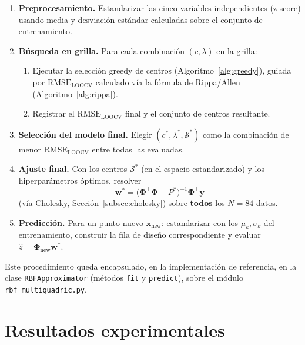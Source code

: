 \documentclass[11pt,a4paper]{article}
\newcommand{\Phimat}{\boldsymbol{\Phi}}
\newcommand{\wvec}{\mathbf{w}}
\newcommand{\yvec}{\mathbf{y}}
\begin{document}
\begin{enumerate}
    \item \textbf{Preprocesamiento.} Estandarizar las cinco variables
    independientes (z-score) usando media y desviaci\'on est\'andar
    calculadas sobre el conjunto de entrenamiento.

    \item \textbf{B\'usqueda en grilla.} Para cada combinaci\'on
    $(c,\lambda)$ en la grilla:
    \begin{enumerate}
        \item Ejecutar la selecci\'on greedy de centros
        (Algoritmo~\ref{alg:greedy}), guiada por $\text{RMSE}_{\text{LOOCV}}$
        calculado v\'ia la f\'ormula de Rippa/Allen (Algoritmo~\ref{alg:rippa}).
        \item Registrar el $\text{RMSE}_{\text{LOOCV}}$ final y el conjunto de
        centros resultante.
    \end{enumerate}

    \item \textbf{Selecci\'on del modelo final.} Elegir $(c^\ast,\lambda^\ast,
    \mathcal S^\ast)$ como la combinaci\'on de menor $\text{RMSE}_{\text{LOOCV}}$
    entre todas las evaluadas.

    \item \textbf{Ajuste final.} Con los centros $\mathcal S^\ast$ (en el
    espacio estandarizado) y los hiperpar\'ametros \'optimos, resolver
    \[
    \wvec^\ast = \big(\Phimat^{\!\top}\Phimat + P^\ast\big)^{-1}
    \Phimat^{\!\top}\yvec
    \]
    (v\'ia Cholesky, Secci\'on~\ref{subsec:cholesky}) sobre \textbf{todos} los
    $N=84$ datos.

    \item \textbf{Predicci\'on.} Para un punto nuevo $\mathbf x_{\text{new}}$:
    estandarizar con los $\mu_k,\sigma_k$ del entrenamiento, construir la fila
    de dise\~no correspondiente y evaluar $\hat z = \Phimat_{\text{new}}
    \wvec^\ast$.
\end{enumerate}

Este procedimiento queda encapsulado, en la implementaci\'on de referencia, en
la clase \texttt{RBFApproximator} (m\'etodos \texttt{fit} y \texttt{predict}),
sobre el m\'odulo \texttt{rbf\_multiquadric.py}.

\section{Resultados experimentales}
\end{document}

